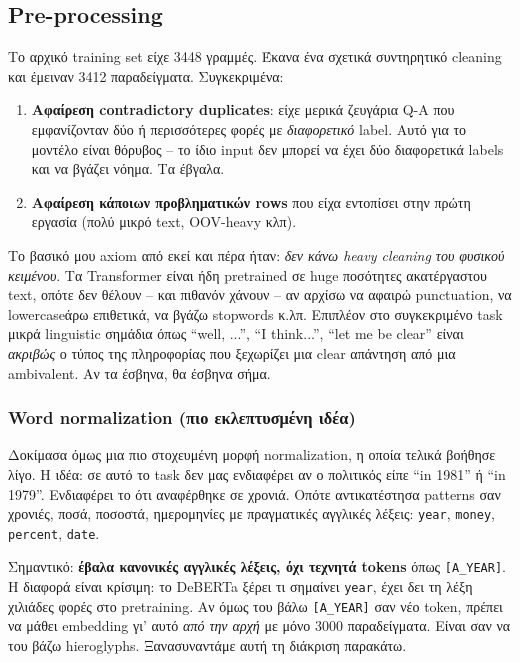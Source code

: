 \documentclass[12pt]{fphw}
\begin{document}
\subsection{Pre-processing}

Το αρχικό training set είχε 3448 γραμμές. Έκανα ένα σχετικά συντηρητικό cleaning και έμειναν 3412 παραδείγματα. Συγκεκριμένα:

\begin{enumerate}
    \item \textbf{Αφαίρεση contradictory duplicates}: είχε μερικά ζευγάρια Q-A που εμφανίζονταν δύο ή περισσότερες φορές με \emph{διαφορετικό} label. Αυτό για το μοντέλο είναι θόρυβος -- το ίδιο input δεν μπορεί να έχει δύο διαφορετικά labels και να βγάζει νόημα. Τα έβγαλα.
    \item \textbf{Αφαίρεση κάποιων προβληματικών rows} που είχα εντοπίσει στην πρώτη εργασία (πολύ μικρό text, OOV-heavy κλπ).
\end{enumerate}

Το βασικό μου axiom από εκεί και πέρα ήταν: \emph{δεν κάνω heavy cleaning του φυσικού κειμένου}. Τα Transformer είναι ήδη pretrained σε huge ποσότητες ακατέργαστου text, οπότε δεν θέλουν -- και πιθανόν χάνουν -- αν αρχίσω να αφαιρώ punctuation, να lowercaseάρω επιθετικά, να βγάζω stopwords κ.λπ. Επιπλέον στο συγκεκριμένο task μικρά linguistic σημάδια όπως ``well, ...'', ``I think...'', ``let me be clear'' είναι \emph{ακριβώς} ο τύπος της πληροφορίας που ξεχωρίζει μια clear απάντηση από μια ambivalent. Αν τα έσβηνα, θα έσβηνα σήμα.

\subsubsection{Word normalization (πιο εκλεπτυσμένη ιδέα)}

Δοκίμασα όμως μια πιο στοχευμένη μορφή normalization, η οποία τελικά βοήθησε λίγο. Η ιδέα: σε αυτό το task δεν μας ενδιαφέρει αν ο πολιτικός είπε ``in 1981'' ή ``in 1979''. Ενδιαφέρει το ότι αναφέρθηκε σε χρονιά. Οπότε αντικατέστησα patterns σαν χρονιές, ποσά, ποσοστά, ημερομηνίες με πραγματικές αγγλικές λέξεις: \texttt{year}, \texttt{money}, \texttt{percent}, \texttt{date}.

Σημαντικό: \textbf{έβαλα κανονικές αγγλικές λέξεις, όχι τεχνητά tokens} όπως \texttt{[A\_YEAR]}. Η διαφορά είναι κρίσιμη: το DeBERTa ξέρει τι σημαίνει \texttt{year}, έχει δει τη λέξη χιλιάδες φορές στο pretraining. Αν όμως του βάλω \texttt{[A\_YEAR]} σαν νέο token, πρέπει να μάθει embedding γι' αυτό \emph{από την αρχή} με μόνο 3000 παραδείγματα. Είναι σαν να του βάζω hieroglyphs. Ξανασυναντάμε αυτή τη διάκριση παρακάτω.
\end{document}
